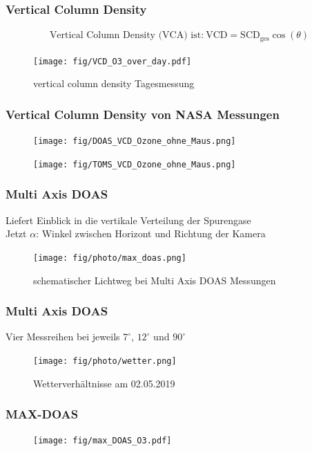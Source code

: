\documentclass{beamer}
\begin{document}
\begin{frame}
    \frametitle{Vertical Column Density }
    \begin{align}
    	\text{Vertical Column Density (VCA) ist:}\	\text{VCD} = \text{SCD}_\text{ges} \cos (\theta)
    \end{align}
    \vspace{-1cm}
    \begin{figure}
    	\texttt{[image: fig/VCD\_O3\_over\_day.pdf]}
		\caption{vertical column density Tagesmessung }    
	\end{figure}
\end{frame}

\begin{frame}
	 \frametitle{Vertical Column Density  von NASA Messungen}
	 \begin{figure}	
    	\texttt{[image: fig/DOAS\_VCD\_Ozone\_ohne\_Maus.png]}
    \end{figure}
    \begin{figure}
    	\texttt{[image: fig/TOMS\_VCD\_Ozone\_ohne\_Maus.png]}
    \end{figure}
	
\end{frame}

\begin{frame}
    \frametitle{Multi Axis DOAS}
    Liefert Einblick in die vertikale Verteilung der Spurengase \\
    Jetzt $\alpha$: Winkel zwischen Horizont und Richtung der Kamera
    \begin{figure}
        \texttt{[image: fig/photo/max\_doas.png]}
        \caption{schematischer Lichtweg bei Multi Axis DOAS Messungen}
    \end{figure}
\end{frame}

\begin{frame}
    \frametitle{Multi Axis DOAS}
    Vier Messreihen bei jeweils $7^\circ$, $12^\circ$ und $90^\circ$ \\
    \begin{figure}
    	\texttt{[image: fig/photo/wetter.png]}
    	\caption{Wetterverhältnisse am 02.05.2019}
    \end{figure}
\end{frame}

\begin{frame}
    \frametitle{MAX-DOAS }
    \begin{figure}
    	\texttt{[image: fig/max\_DOAS\_O3.pdf]}
    \end{figure}
\end{frame}
\end{document}
